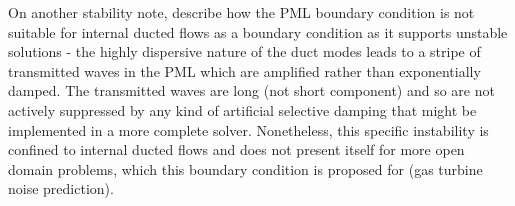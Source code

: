 On another stability note, \textcite{tam1998pmlopenducted} describe how the PML boundary condition is not suitable for internal ducted flows as a boundary condition as it supports unstable solutions - the highly dispersive nature of the duct modes leads to a stripe of transmitted waves in the PML which are amplified rather than exponentially damped. The transmitted waves are long (not short component) and so are not actively suppressed by any kind of artificial selective damping \cite{tam2012computational} that might be implemented in a more complete solver. Nonetheless, this specific instability is confined to internal ducted flows and does not present itself for more open domain problems, which this boundary condition is proposed for (gas turbine noise prediction).